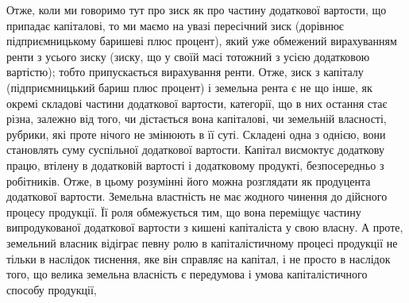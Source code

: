 Отже, коли ми говоримо тут про зиск як про частину додаткової вартости,
що припадає капіталові, то ми маємо на увазі пересічний зиск (дорівнює підприємницькому
баришеві плюс процент), який уже обмежений вирахуванням
ренти з усього зиску (зиску, що у своїй масі тотожний з усією додатковою
вартістю); тобто припускається вирахування ренти. Отже, зиск з капіталу (підприємницький
бариш плюс процент) і земельна рента є не що інше, як окремі
складові частини додаткової вартости, категорії, що в них остання стає різна,
залежно від того, чи дістається вона капіталові, чи земельній власності, рубрики,
які проте нічого не змінюють в її суті. Складені одна з однією, вони становлять
суму суспільної додаткової вартости. Капітал висмоктує додаткову працю, втілену
в додатковій вартості і додатковому продукті, безпосередньо з робітників. Отже,
в цьому розумінні його можна розглядати як продуцента додаткової вартости.
Земельна властність не має жодного чинення до дійсного процесу продукції.
Її роля обмежується тим, що вона переміщує частину випродукованої додаткової
вартости з кишені капіталіста у свою власну. А проте, земельний власник відіграє
певну ролю в капіталістичному процесі продукції не тільки в наслідок
тиснення, яке він справляє на капітал, і не просто в наслідок того, що велика
земельна власність є передумова і умова капіталістичного способу продукції,
